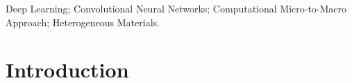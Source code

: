\documentclass[final,3p,times]{elsarticle}
\begin{document}
\begin{frontmatter}
\begin{abstract}
\bigskip
\bigskip

\begin{comment}
Material modeling using modern numerical methods accelerates the design process and reduces the costs of developing new products. However, for multiscale modeling of heterogeneous materials, the well-established {\it homogenization techniques} remain  {\it  computationally expensive} for high accuracy levels. In this contribution, a machine learning approach, Convolutional 
Neural Networks (CNNs), is proposed as a computationally  efficient solution method that is capable of  providing  a high level of accuracy. In this work,  the data-set used for the training process, as well as the numerical tests, consists of artificial/real microstructural  images (``input''). Whereas, the output is the homogenized stress of a given representative volume element $\cal{RVE}$. The model performance is demonstrated by means of examples and compared with traditional homogenization methods. As the examples illustrate, high accuracy in predicting the homogenized stresses, along with a significant reduction in the computation time, were achieved using the developed CNN model.
\end{comment}

\end{abstract}


\begin{keyword}
Deep Learning; Convolutional Neural Networks; Computational Micro-to-Macro Approach; Heterogeneous Materials.
\end{keyword}

\end{frontmatter}


\section{Introduction}
\label{sec1-CNN}
\end{document}
